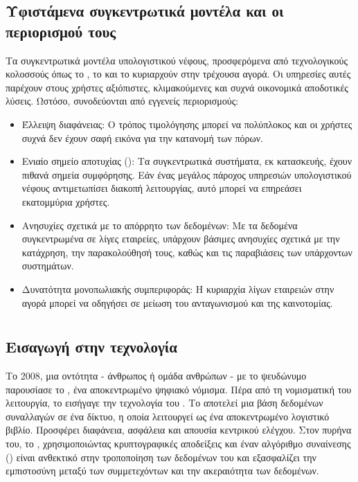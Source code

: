 \subsection{Υφιστάμενα συγκεντρωτικά μοντέλα και οι περιορισμού τους}
Τα συγκεντρωτικά μοντέλα υπολογιστικού νέφους, προσφερόμενα από τεχνολογικούς 
κολοσσούς όπως το , το  και το 
κυριαρχούν στην τρέχουσα αγορά. Οι υπηρεσίες αυτές παρέχουν στους χρήστες 
αξιόπιστες, κλιμακούμενες και συχνά οικονομικά αποδοτικές λύσεις. Ωστόσο, 
συνοδεύονται από εγγενείς περιορισμούς:
\begin{itemize}
\item Έλλειψη διαφάνειας: Ο τρόπος τιμολόγησης μπορεί να πολύπλοκος και οι 
χρήστες συχνά δεν έχουν σαφή εικόνα για την κατανομή των πόρων.
\item Ενιαίο σημείο αποτυχίας (): Τα συγκεντρωτικά 
συστήματα, εκ κατασκευής, έχουν πιθανά σημεία συμφόρησης. Εάν ένας μεγάλος 
πάροχος υπηρεσιών υπολογιστικού νέφους αντιμετωπίσει διακοπή λειτουργίας, 
αυτό μπορεί να επηρεάσει εκατομμύρια χρήστες.
\item Ανησυχίες σχετικά με το απόρρητο των δεδομένων: Με τα δεδομένα 
συγκεντρωμένα σε λίγες εταιρείες, υπάρχουν βάσιμες ανησυχίες σχετικά με την 
κατάχρηση, την παρακολούθησή τους, καθώς και τις παραβιάσεις των υπάρχοντων 
συστημάτων.
\item Δυνατότητα μονοπωλιακής συμπεριφοράς: Η κυριαρχία λίγων εταιρειών στην 
αγορά μπορεί να οδηγήσει σε μείωση του ανταγωνισμού και της καινοτομίας.
\end{itemize}

\section{}
\subsection{Εισαγωγή στην τεχνολογία }
Το 2008, μια οντότητα - άνθρωπος ή ομάδα ανθρώπων - με το ψευδώνυμο  παρουσίασε το , ένα αποκεντρωμένο ψηφιακό νόμισμα. Πέρα από τη νομισματική του λειτουργία, το  εισήγαγε την τεχνολογία του . 
Το  αποτελεί μια βάση δεδομένων συναλλαγών σε ένα δίκτυο, η οποία λειτουργεί ως ένα αποκεντρωμένο λογιστικό βιβλίο. Προσφέρει διαφάνεια, ασφάλεια και απουσία κεντρικού ελέγχου. Στον πυρήνα του, το , χρησιμοποιώντας κρυπτογραφικές αποδείξεις και έναν αλγόριθμο συναίνεσης () είναι ανθεκτικό στην τροποποίηση των δεδομένων του και εξασφαλίζει την εμπιστοσύνη μεταξύ των συμμετεχόντων και την ακεραιότητα των δεδομένων.

